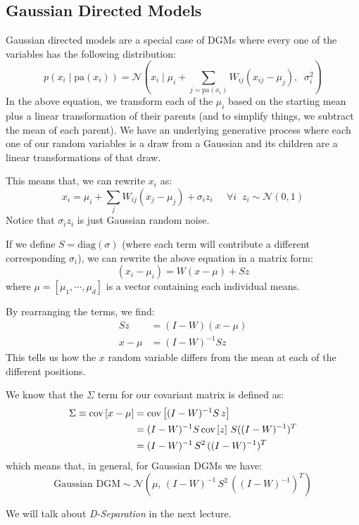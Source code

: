 \documentclass{article}
\newcommand{\N}{\mathcal{N}}
\begin{document}
\subsection{Gaussian Directed Models}
Gaussian directed models are a special case of DGMs where every one of the variables has the following distribution:
\[
p(x_i \mid \mathrm{pa}(x_i)) = \N (x_i \mid \mu_i + \sum_{j = \mathrm{pa}(x_i)} W_{ij} (x_{ij} - \mu_j), \;\; \sigma_i^2) 
\]
In the above equation, we transform each of the $\mu_i$ based on the starting mean plus a linear transformation of their parents (and to simplify things, we subtract the mean of each parent). We have an underlying generative process where each one of our random variables is a draw from a Gaussian and its children  are a linear transformations of that draw.

This means that, we can rewrite $x_{i}$ as:
\[
x_i = \mu_i + \sum_j W_{ij} (x_j - \mu_j) + \sigma_i z_i \;\;\;\;\; \forall i \;\; z_i \sim \N(0,1)
\]
Notice that $\sigma_i z_i$ is just Gaussian random noise.

If we define $S = \mathrm{diag} (\sigma)$ (where each term will contribute a different corresponding $\sigma_i$), we can rewrite the above equation in a matrix form:
\[
(x_i - \mu_i) = W(x-\mu) + S z
\]
where $\mu = \left[ \mu_1, \cdots, \mu_d\right]$ is a vector containing each individual means.

By rearranging the terms, we find:
\begin{align*}
S z &= (I - W) (x - \mu)\\
x - \mu &= (I-W)^{-1} S z 
\end{align*}
This tells us how the $x$ random variable differs from the mean at each of the different positions.

We know that the $\Sigma$ term for our covariant matrix is defined as:
\begin{align*} 
\Sigma \equiv \text{cov} \left[x - \mu \right] &= \text{cov} \left[ (I - W)^{-1} S \,z \right] \\
&= (I - W)^{-1} S \, \text{cov} \left[ z \right] \, S ((I-W)^{-1})^T\\
&= (I - W)^{-1} \, S^2 \, ((I-W)^{-1})^T
\end{align*}
which means that, in general, for Gaussian DGMs we have:
\[
\text{Gaussian DGM} \sim \N(\mu,\, (I - W)^{-1} \, S^2 \,  ((I-W)^{-1})^T)
\]
\begin{remark}
We will talk about \emph{D-Separation} in the next lecture.
\end{remark}
\end{document}
